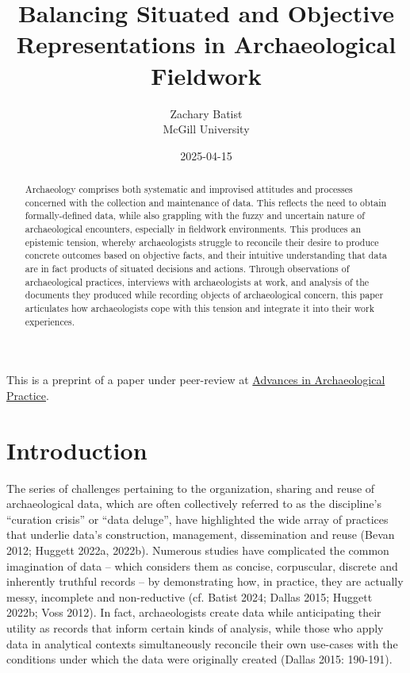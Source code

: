 \documentclass[
]{article}
\title{Balancing Situated and Objective Representations in
Archaeological Fieldwork}
\author{
      {Zachary
Batist \orcidlink{0000-0003-0435-508X} \href{mailto:zachary.batist@mcgill.ca}{\Letter}} \\
          McGill University
     \\
  }
\date{2025-04-15}
\begin{document}
\maketitle
\begin{abstract}
Archaeology comprises both systematic and improvised attitudes and
processes concerned with the collection and maintenance of data. This
reflects the need to obtain formally-defined data, while also grappling
with the fuzzy and uncertain nature of archaeological encounters,
especially in fieldwork environments. This produces an epistemic
tension, whereby archaeologists struggle to reconcile their desire to
produce concrete outcomes based on objective facts, and their intuitive
understanding that data are in fact products of situated decisions and
actions. Through observations of archaeological practices, interviews
with archaeologists at work, and analysis of the documents they produced
while recording objects of archaeological concern, this paper
articulates how archaeologists cope with this tension and integrate it
into their work experiences.
\end{abstract}


\begin{tcolorbox}[enhanced jigsaw, colback=white, bottomrule=.15mm, leftrule=.75mm, arc=.35mm, rightrule=.15mm, breakable, colframe=quarto-callout-note-color-frame, toprule=.15mm, opacitybacktitle=0.6, title=\textcolor{quarto-callout-note-color}{\faInfo}\hspace{0.5em}{Note}, coltitle=black, bottomtitle=1mm, toptitle=1mm, titlerule=0mm, colbacktitle=quarto-callout-note-color!10!white, opacityback=0, left=2mm]

This is a preprint of a paper under peer-review at
\href{https://www.cambridge.org/core/journals/advances-in-archaeological-practice}{Advances
in Archaeological Practice}.

\end{tcolorbox}

\section{Introduction}\label{introduction}

The series of challenges pertaining to the organization, sharing and
reuse of archaeological data, which are often collectively referred to
as the discipline's ``curation crisis'' or ``data deluge'', have
highlighted the wide array of practices that underlie data's
construction, management, dissemination and reuse (Bevan 2012; Huggett
2022a, 2022b). Numerous studies have complicated the common imagination
of data -- which considers them as concise, corpuscular, discrete and
inherently truthful records -- by demonstrating how, in practice, they
are actually messy, incomplete and non-reductive (cf. Batist 2024;
Dallas 2015; Huggett 2022b; Voss 2012). In fact, archaeologists create
data while anticipating their utility as records that inform certain
kinds of analysis, while those who apply data in analytical contexts
simultaneously reconcile their own use-cases with the conditions under
which the data were originally created (Dallas 2015: 190-191).
\end{document}
